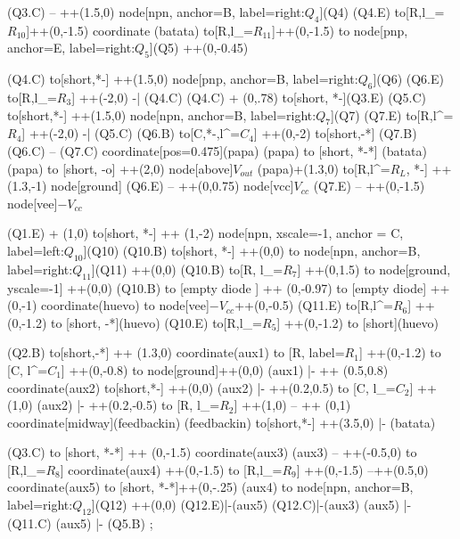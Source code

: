 \begin{circuitikz}
	(Q3.C) -- ++(1.5,0) node[npn, anchor=B, label=right:$Q_4$](Q4){}
	(Q4.E) to[R,l_=$R_{10}$]++(0,-1.5) coordinate (batata) to[R,l_=$R_{11}$]++(0,-1.5)
	to node[pnp, anchor=E, label=right:$Q_5$](Q5){} ++(0,-0.45)
	
	(Q4.C) to[short,*-] ++(1.5,0) node[pnp, anchor=B, label=right:$Q_6$](Q6){}
	(Q6.E) to[R,l_=$R_3$] ++(-2,0) -| (Q4.C)
	(Q4.C) + (0,.78) to[short, *-](Q3.E)
	(Q5.C) to[short,*-] ++(1.5,0) node[npn, anchor=B, label=right:$Q_7$](Q7){}
	(Q7.E) to[R,l^=$R_4$] ++(-2,0) -| (Q5.C)
	(Q6.B) to[C,*-,l^=$C_4$] ++(0,-2) to[short,-*] (Q7.B)
	(Q6.C) -- (Q7.C) coordinate[pos=0.475](papa) 
	(papa) to [short, *-*] (batata)
	(papa) to [short, -o] ++(2,0) node[above]{$V_{out}$}
	(papa)+(1.3,0) to[R,l^=$R_L$, *-] ++(1.3,-1) node[ground]{}
	(Q6.E) -- ++(0,0.75) node[vcc]{$V_{cc}$}
	(Q7.E) -- ++(0,-1.5) node[vee]{$-V_{cc}$}
	
	
	(Q1.E) + (1,0) to[short, *-] ++ (1,-2) node[npn, xscale=-1, anchor = C, label=left:$Q_{10}$](Q10){}
	(Q10.B) to[short, *-] ++(0,0) to node[npn, anchor=B, label=right:$Q_{11}$](Q11){} ++(0,0)
	(Q10.B) to[R, l_=$R_7$] ++(0,1.5) to node[ground, yscale=-1]{} ++(0,0)
	(Q10.B) to [empty diode ] ++ (0,-0.97)
	to [empty diode] ++ (0,-1) coordinate(huevo)
	to node[vee]{$-V_{cc}$}++(0,-0.5)
	(Q11.E) to[R,l^=$R_6$] ++(0,-1.2) to [short, -*](huevo)
	(Q10.E) to[R,l_=$R_5$] ++(0,-1.2) to [short](huevo)	
	
	
	
	(Q2.B) to[short,-*] ++ (1.3,0) coordinate(aux1){}
	to [R, label=$R_1$] ++(0,-1.2) to [C, l^=$C_1$] ++(0,-0.8) to node[ground]{}++(0,0)
	(aux1) |- ++ (0.5,0.8) coordinate(aux2){} to[short,*-] ++(0,0)
	(aux2) |- ++(0.2,0.5) to [C, l_=$C_2$] ++(1,0) 
	(aux2) |- ++(0.2,-0.5) to [R, l_=$R_2$] ++(1,0)
	-- ++ (0,1) coordinate[midway](feedbackin)
	(feedbackin) to[short,*-] ++(3.5,0) |- (batata)
	
	(Q3.C) to [short, *-*] ++ (0,-1.5) coordinate(aux3)
	(aux3) -- ++(-0.5,0) to [R,l_=$R_8$] coordinate(aux4) ++(0,-1.5) to [R,l_=$R_9$] ++(0,-1.5) --++(0.5,0) coordinate(aux5) to [short, *-*]++(0,-.25)
	(aux4) to node[npn, anchor=B, label=right:$Q_{12}$](Q12){} ++(0,0) 
	(Q12.E)|-(aux5)
	(Q12.C)|-(aux3)
	(aux5) |- (Q11.C)	
	(aux5) |- (Q5.B)
	;
\end{circuitikz}%